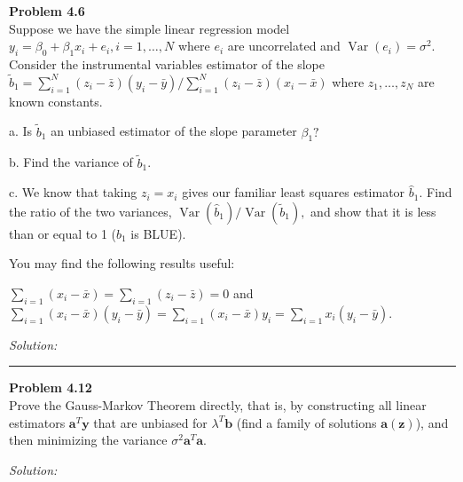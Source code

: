 \documentclass[a4paper, 11pt]{article}
\newenvironment{problem}[2][Problem]
    { \begin{mdframed}[backgroundcolor=gray!20] \textbf{#1 #2} \\}
    {  \end{mdframed}}
\newenvironment{solution}
    {\textit{Solution:}}
    {}
\begin{document}
\begin{problem}{4.6}
Suppose we have the simple linear regression model \(y_{i}=\beta_{0}+\beta_{1} x_{i}+e_{i}, i=1, \ldots, N\) where \(e_{i}\) are uncorrelated and \(\operatorname{Var}\left(e_{i}\right)=\sigma^{2} .\) Consider the instrumental variables estimator of the slope \(\tilde{b}_{1}=\sum_{i=1}^{N}\left(z_{i}-\bar{z}\right)\left(y_{i}-\bar{y}\right) / \sum_{i=1}^{N}\left(z_{i}-\bar{z}\right)\left(x_{i}-\bar{x}\right)\) where \(z_{1}, \ldots, z_{N}\) are known constants.

a. Is \(\tilde{b}_{1}\) an unbiased estimator of the slope parameter \(\beta_{1} ?\)

b. Find the variance of \(\tilde{b}_{1}\).

c. We know that taking \(z_{i}=x_{i}\) gives our familiar least squares estimator
\(\hat{b}_{1} .\) Find the ratio of the two variances, \(\operatorname{Var}\left(\hat{b}_{1}\right) / \operatorname{Var}\left(\tilde{b}_{1}\right),\) and show that
it is less than or equal to 1 ($\hat{b}_{1}$ is BLUE).


You may find the following results useful:

\(\sum_{i=1}\left(x_{i}-\bar{x}\right)=\sum_{i=1}\left(z_{i}-\bar{z}\right)=0\)
and \(\sum_{i=1}\left(x_{i}-\bar{x}\right)\left(y_{i}-\bar{y}\right)=\sum_{i=1}\left(x_{i}-\bar{x}\right) y_{i}=\sum_{i=1} x_{i}\left(y_{i}-\bar{y}\right)\).


\end{problem}
\begin{solution}

\end{solution} 

\noindent\rule{7in}{2.8pt}

\begin{problem}{4.12}
Prove the Gauss-Markov Theorem directly, that is, by constructing all linear
estimators  \(\mathbf{a}^{T} \mathbf{y}\) that are unbiased for \(\lambda^{T} \mathbf{b}\) (find a family of solutions $\mathbf{a}(\mathbf{z})$), and
then minimizing the variance \(\sigma^{2} \mathbf{a}^{T} \mathbf{a}\).

\end{problem}
\begin{solution}

\end{solution} 
\end{document}
